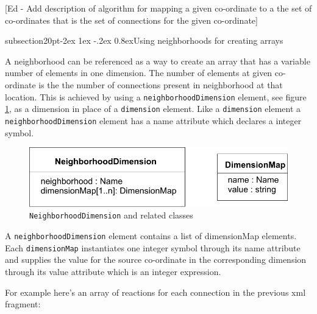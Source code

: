 \documentclass[10pt]{article}
\makeatletter
\renewcommand{\subsection}{\@startsection%
  {subsection}{2}{0pt}{-2ex \@plus 1ex \@minus -.2ex}%
  {0.8ex}{\slshape\large\bfseries\sffamily}}
\newcommand{\class}[1]{\texttt{#1}}
\makeatother
\begin{document}
[Ed - Add description of algorithm for mapping a given co-ordinate to a
the set of co-ordinates that is the set of connections for the
given co-ordinate]

\subsection{Using neighborhoods for creating arrays}

A neighborhood can be referenced as a way to create an array that
has a variable number of elements in one dimension. The number of
elements at given co-ordinate is the the number of connections
present in neighborhood at that location.  This is achieved by
using a \class{neighborhoodDimension} element, see figure
\ref{fig:neighborhoodDimension}, as a dimension in place of a
\class{dimension} element.  Like a \class{dimension} element a
\class{neighborhoodDimension} element has a name attribute which
declares a integer symbol.

\begin{figure}

  \centering

  \includegraphics[scale = 0.75]{neighborhoodDimension}

  \caption{\class{NeighborhoodDimension} and related classes}

  \label{fig:neighborhoodDimension}

\end{figure}

A \class{neighborhoodDimension} element contains a list of
dimensionMap elements.  Each \class{dimensionMap} instantiates
one integer symbol through its name attribute and supplies the
value for the source co-ordinate in the corresponding dimension
through its value attribute which is an integer expression.

For example here's an array of reactions for each connection in
the previous xml fragment:
\end{document}
